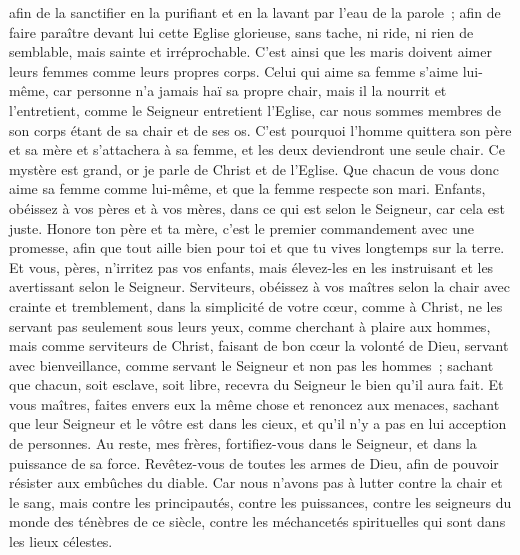 \begin{multicols}{2}
afin de la sanctifier en la purifiant et en la lavant par l'eau de la parole~;
afin de faire paraître devant lui cette Eglise glorieuse, sans tache, ni ride, ni rien de semblable, mais sainte et irréprochable.
C'est ainsi que les maris doivent aimer leurs femmes comme leurs propres corps. Celui qui aime sa femme s'aime lui-même,
car personne n'a jamais haï sa propre chair, mais il la nourrit et l'entretient, comme le Seigneur entretient l'Eglise,
car nous sommes membres de son corps étant de sa chair et de ses os.
C'est pourquoi l'homme quittera son père et sa mère et s'attachera à sa femme, et les deux deviendront une seule chair.
Ce mystère est grand, or je parle de Christ et de l'Eglise.
Que chacun de vous donc aime sa femme comme lui-même, et que la femme respecte son mari.
\VerseOne{}Enfants, obéissez à vos pères et à vos mères, dans ce qui est selon le Seigneur, car cela est juste.
Honore ton père et ta mère, c'est le premier commandement avec une promesse,
afin que tout aille bien pour toi et que tu vives longtemps sur la terre.
Et vous, pères, n'irritez pas vos enfants, mais élevez-les en les instruisant et les avertissant selon le Seigneur.
Serviteurs, obéissez à vos maîtres selon la chair avec crainte et tremblement, dans la simplicité de votre cœur, comme à Christ,
ne les servant pas seulement sous leurs yeux, comme cherchant à plaire aux hommes, mais comme serviteurs de Christ, faisant de bon cœur la volonté de Dieu,
servant avec bienveillance, comme servant le Seigneur et non pas les hommes~;
sachant que chacun, soit esclave, soit libre, recevra du Seigneur le bien qu'il aura fait.
Et vous maîtres, faites envers eux la même chose et renoncez aux menaces, sachant que leur Seigneur et le vôtre est dans les cieux, et qu'il n'y a pas en lui acception de personnes.
Au reste, mes frères, fortifiez-vous dans le Seigneur, et dans la puissance de sa force.
Revêtez-vous de toutes les armes de Dieu, afin de pouvoir résister aux embûches du diable.
Car nous n'avons pas à lutter contre la chair et le sang, mais contre les principautés, contre les puissances, contre les seigneurs du monde des ténèbres de ce siècle, contre les méchancetés spirituelles qui sont dans les lieux célestes.

\end{multicols}
